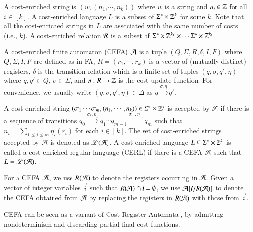

A cost-enriched string is $(w, (n_1, \cdots, n_k))$ where $w$ is a string and $n_i \in \mathbb{Z}$ for all $i \in [k]$. 
A cost-enriched language $L$ is a subset of $\Sigma^* \times \mathbb{Z}^k$ for some $k$. Note that all the cost-enriched strings in $L$ are associated with the same number of costs (i.e., $k$).
A cost-enriched relation $\mathcal{R}$ is a subset of $\Sigma^* \times \mathbb{Z}^{k_1} \times \cdots \Sigma^* \times \mathbb{Z}^{k_l}$.

\begin{definition}
	A cost-enriched finite automaton (CEFA) $\mathcal{A}$ is a tuple $(Q, \Sigma, R, \delta, I, F)$ where $Q, \Sigma, I, F$ are defined as in FA, $R=(r_1, \cdots, r_k)$ is a vector of (mutually distinct) registers, $\delta$ is the transition relation which is a finite set of tuples $(q, \sigma, q', \eta)$ where $q, q' \in Q$, $\sigma \in \Sigma$, and $\eta: R \rightarrow \mathbb{Z}$ is the cost-update function. For convenience, we usually write $(q, \sigma, q', \eta) \in \Delta$ as $q \xrightarrow{\sigma, \eta} q'$.
	
	A cost-enriched string $(\sigma_1 \cdots \sigma_m, (n_1, \cdots,n_k)) \in \Sigma^* \times \mathbb{Z}^k$ is accepted by $\mathcal{A}$ if there is a sequence of transitions $q_0 \xrightarrow{\sigma_1, \eta_1} q_1 \cdots q_{m-1} \xrightarrow{\sigma_m, \eta_m} q_m$ such that $n_i = \sum_{1\leq j\leq m}\eta_j(r_i)$ for each $i \in [k]$. The set of cost-enriched strings accepted by $\mathcal{A}$ is denoted as $\mathscr{L}(\mathcal{A})$. A cost-enriched language $L \subseteq \Sigma^* \times \mathbb{Z}^k$ is called a cost-enriched regular language (CERL) if there is a CEFA $\mathcal{A}$ such that $L = \mathscr{L}(\mathcal{A})$.
\end{definition}


For a CEFA $\mathcal{A}$, we use $R(\mathcal{A})$ to denote the registers occurring in $\mathcal{A}$. %
Given a vector of integer variables $\vec{i}$ such that $R(\NFA) \cap \vec{i} = \emptyset$, we use $\NFA[\vec{i}/R(\NFA)]$ to denote the CEFA obtained from $\mathcal{A}$ by replacing the registers in $R(\mathcal{A})$ with those from $\vec{i}$. 

CEFA can be seen as a variant of Cost Register Automata \cite{RLJ+13}, by admitting nondeterminism and discarding partial final cost functions. 

